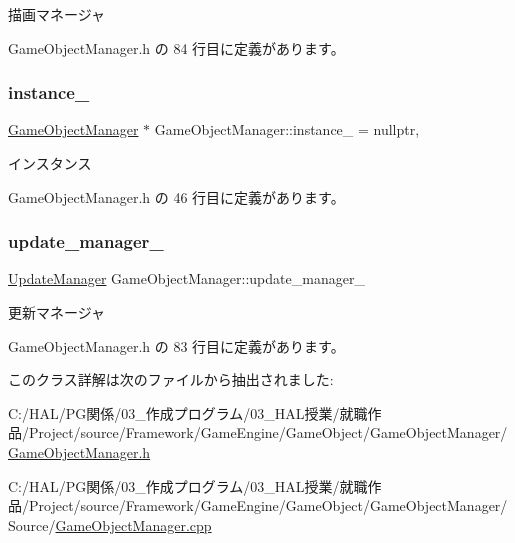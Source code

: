描画マネージャ 



 Game\+Object\+Manager.\+h の 84 行目に定義があります。

\mbox{\label{class_game_object_manager_ab21e2defb8f4f41bded4f8ab98be07aa}} 
\subsubsection{\texorpdfstring{instance\+\_\+}{instance\_}}
{\footnotesize\ttfamily \mbox{\hyperlink{class_game_object_manager}{Game\+Object\+Manager}} $\ast$ Game\+Object\+Manager\+::instance\+\_\+ = nullptr\hspace{0.3cm}{\ttfamily [static]}, {\ttfamily [private]}}



インスタンス 



 Game\+Object\+Manager.\+h の 46 行目に定義があります。

\mbox{\label{class_game_object_manager_a330c1759e1a075fb257a01c6f48cf9f3}} 
\subsubsection{\texorpdfstring{update\+\_\+manager\+\_\+}{update\_manager\_}}
{\footnotesize\ttfamily \mbox{\hyperlink{class_update_manager}{Update\+Manager}} Game\+Object\+Manager\+::update\+\_\+manager\+\_\+\hspace{0.3cm}{\ttfamily [private]}}



更新マネージャ 



 Game\+Object\+Manager.\+h の 83 行目に定義があります。



このクラス詳解は次のファイルから抽出されました\+:\begin{DoxyCompactItemize}
\item 
C\+:/\+H\+A\+L/\+P\+G関係/03\+\_\+作成プログラム/03\+\_\+\+H\+A\+L授業/就職作品/\+Project/source/\+Framework/\+Game\+Engine/\+Game\+Object/\+Game\+Object\+Manager/\mbox{\hyperlink{_game_object_manager_8h}{Game\+Object\+Manager.\+h}}\item 
C\+:/\+H\+A\+L/\+P\+G関係/03\+\_\+作成プログラム/03\+\_\+\+H\+A\+L授業/就職作品/\+Project/source/\+Framework/\+Game\+Engine/\+Game\+Object/\+Game\+Object\+Manager/\+Source/\mbox{\hyperlink{_game_object_manager_8cpp}{Game\+Object\+Manager.\+cpp}}\end{DoxyCompactItemize}
